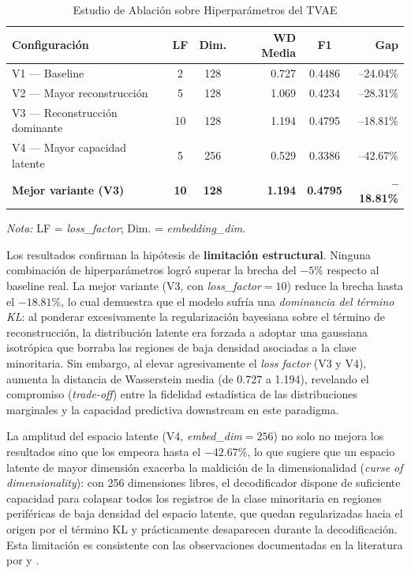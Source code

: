 \begin{table}[htbp]
\centering
\caption{Estudio de Ablación sobre Hiperparámetros del TVAE}
\label{tab:ablation_tvae}
\begin{tabularx}{\textwidth}{>{\raggedright\arraybackslash}X c c r c r}
\toprule
\textbf{Configuración} & \textbf{LF} & \textbf{Dim.} & \textbf{WD Media} & \textbf{F1} & \textbf{Gap} \\
\midrule
\rowcolor{gray!10} V1 --- Baseline & 2 & 128 & 0.727 & 0.4486 & --24.04\% \\
V2 --- Mayor reconstrucción & 5 & 128 & 1.069 & 0.4234 & --28.31\% \\
\rowcolor{gray!10} V3 --- Reconstrucción dominante & 10 & 128 & 1.194 & 0.4795 & --18.81\% \\
V4 --- Mayor capacidad latente & 5 & 256 & 0.529 & 0.3386 & --42.67\% \\
\midrule
\rowcolor{uaxblue!10} \textbf{Mejor variante (V3)} & \textbf{10} & \textbf{128} & \textbf{1.194} & \textbf{0.4795} & \textbf{--18.81\%} \\
\bottomrule
\end{tabularx}
\end{table}
\smallskip
{\footnotesize \textit{Nota:} LF = \textit{loss\_factor}; Dim. = \textit{embedding\_dim}.}

Los resultados confirman la hipótesis de \textbf{limitación estructural}. Ninguna combinación de hiperparámetros logró superar la brecha del $-5\%$ respecto al baseline real. La mejor variante (V3, con \textit{loss\_factor}$=10$) reduce la brecha hasta el $-18.81\%$, lo cual demuestra que el modelo sufría una \textit{dominancia del término KL}: al ponderar excesivamente la regularización bayesiana sobre el término de reconstrucción, la distribución latente era forzada a adoptar una gaussiana isotrópica que borraba las regiones de baja densidad asociadas a la clase minoritaria. Sin embargo, al elevar agresivamente el \textit{loss factor} (V3 y V4), aumenta la distancia de Wasserstein media (de 0.727 a 1.194), revelando el compromiso (\textit{trade-off}) entre la fidelidad estadística de las distribuciones marginales y la capacidad predictiva downstream en este paradigma.

La amplitud del espacio latente (V4, \textit{embed\_dim}$=256$) no solo no mejora los resultados sino que los empeora hasta el $-42.67\%$, lo que sugiere que un espacio latente de mayor dimensión exacerba la maldición de la dimensionalidad (\textit{curse of dimensionality}): con 256 dimensiones libres, el decodificador dispone de suficiente capacidad para colapsar todos los registros de la clase minoritaria en regiones periféricas de baja densidad del espacio latente, que quedan regularizadas hacia el origen por el término KL y prácticamente desaparecen durante la decodificación. Esta limitación es consistente con las observaciones documentadas en la literatura por \textcite{elemam2020synthetic} y \textcite{stadler2022synthetic}.

